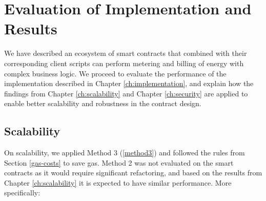 \chapter{Evaluation of Implementation and Results}\label{ch:results}

We have described an ecosystem of smart contracts that combined with their corresponding client scripts can perform metering and billing of energy with complex business logic. We proceed to evaluate the performance of the implementation described in Chapter \ref{ch:implementation}, and explain how the findings from Chapter \ref{ch:scalability} and Chapter \ref{ch:security} are applied to enable better scalability and robustness in the contract design.

\section{Scalability}
On scalability, we applied Method 3 (\ref{method3}) and followed the rules from Section \ref{gas-costs} to save gas. Method 2 was not evaluated on the smart contracts as it would require significant refactoring, and based on the results from Chapter \ref{ch:scalability} it is expected to have similar performance. More specifically:

